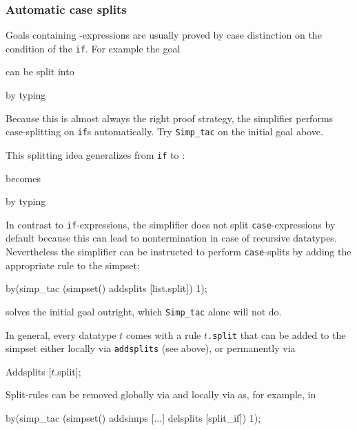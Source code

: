 \subsubsection{Automatic case splits}

Goals containing -expressions are usually proved by case
distinction on the condition of the \texttt{if}. For example the goal
\begin{ttbox}
\end{ttbox}
can be split into
\begin{ttbox}
\end{ttbox}
by typing
\begin{ttbox}
\end{ttbox}
Because this is almost always the right proof strategy, the simplifier
performs case-splitting on \texttt{if}s automatically. Try \texttt{Simp_tac}
on the initial goal above.

This splitting idea generalizes from \texttt{if} to :
\begin{ttbox}\makeatother
{}
\end{ttbox}
becomes
\begin{ttbox}\makeatother
{}
\end{ttbox}
by typing
\begin{ttbox}
\end{ttbox}
In contrast to \texttt{if}-expressions, the simplifier does not split
\texttt{case}-expressions by default because this can lead to nontermination
in case of recursive datatypes.
Nevertheless the simplifier can be instructed to perform \texttt{case}-splits
by adding the appropriate rule to the simpset:
\begin{ttbox}
by(simp_tac (simpset() addsplits [list.split]) 1);
\end{ttbox}
solves the initial goal outright, which \texttt{Simp_tac} alone will not do.

In general, every datatype $t$ comes with a rule
\texttt{$t$.split} that can be added to the simpset either
locally via \texttt{addsplits} (see above), or permanently via
\begin{ttbox}
Addsplits [\(t\).split];
\end{ttbox}
Split-rules can be removed globally via  and locally
via  as, for example, in
\begin{ttbox}
by(simp_tac (simpset() addsimps [\(\dots\)] delsplits [split_if]) 1);
\end{ttbox}


